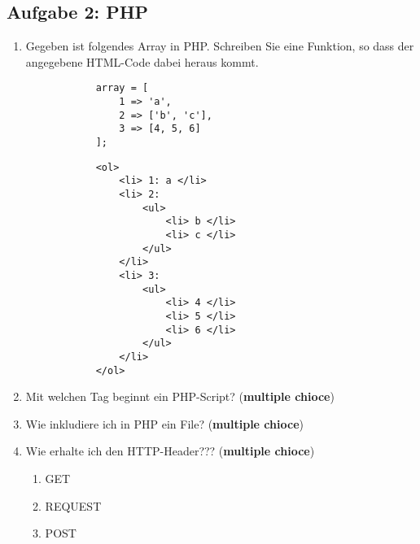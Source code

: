 \subsection{Aufgabe 2: PHP}
\label{sec:Aufgabe2}
\begin{enumerate}[label=\alph*)]
    \item Gegeben ist folgendes Array in PHP. Schreiben Sie eine Funktion, so dass der angegebene HTML-Code dabei heraus kommt.
        \begin{verbatim}
            array = [
                1 => 'a',
                2 => ['b', 'c'],
                3 => [4, 5, 6]
            ];
        \end{verbatim}
    
        \begin{verbatim}
            <ol>
                <li> 1: a </li>
                <li> 2:
                    <ul>
                        <li> b </li>
                        <li> c </li>
                    </ul>
                </li>
                <li> 3:
                    <ul>
                        <li> 4 </li>
                        <li> 5 </li>
                        <li> 6 </li>
                    </ul>
                </li>
            </ol>
        \end{verbatim}
    \item Mit welchen Tag beginnt ein PHP-Script? (\textbf{multiple chioce})
    \item Wie inkludiere ich in PHP ein File? (\textbf{multiple chioce})
    \item Wie erhalte ich den HTTP-Header??? (\textbf{multiple chioce})
        \begin{enumerate}[label=\arabic*.]
            \item GET
            \item REQUEST
            \item POST
        \end{enumerate}
\end{enumerate}
